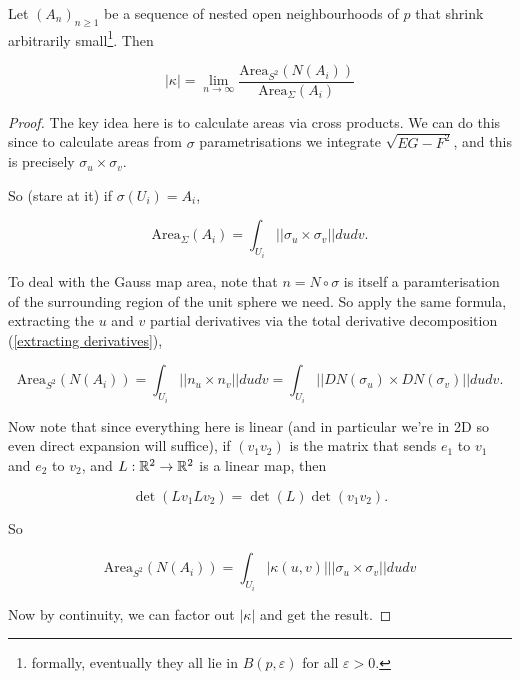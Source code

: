 \documentclass[11pt]{scrartcl}
\begin{document}
\begin{proposition}

Let $(A_n)_{n \ge 1}$ be a sequence of nested open neighbourhoods of $p$ that shrink arbitrarily small\footnote{formally, eventually they all lie in $B(p, \varepsilon)$ for all $\varepsilon > 0$.}. Then 

\begin{equation}
    |\kappa| = \lim_{n \rightarrow \infty} \frac{\text{Area}_{S^2}(N(A_i))}{\text{Area}_\Sigma(A_i)}
\end{equation} 

\begin{proof}
    The key idea here is to calculate areas via cross products. We can do this since to calculate areas from $\sigma$ parametrisations we integrate $\sqrt{EG-F^2}$, and this is precisely $\sigma_u \times \sigma_v$.
    
    So (stare at it) if $\sigma(U_i) = A_i$,

    \begin{equation}
        \text{Area}_\Sigma(A_i) = \int_{U_i} ||\sigma_u \times \sigma_v|| du dv.
    \end{equation}

    To deal with the Gauss map area, note that $n = N \circ \sigma$ is itself a paramterisation of the surrounding region of the unit sphere we need. So apply the same formula, extracting the $u$ and $v$ partial derivatives via the total derivative decomposition (\ref{extracting derivatives}),

    \begin{equation}
        \text{Area}_{S^2}(N(A_i)) = \int_{U_i} ||n_u \times n_v|| du dv = \int_{U_i} ||DN(\sigma_u) \times DN(\sigma_v)|| du dv.
    \end{equation}

    Now note that since everything here is linear (and in particular we're in 2D so even direct expansion will suffice), if $(v_1 v_2)$ is the matrix that sends $e_1$ to $v_1$ and $e_2$ to $v_2$, and $L:\mathbb R^2 \rightarrow \mathbb R^2$ is a linear map, then

    \begin{equation}
        \det(Lv_1 Lv_2) = \det (L) \det(v_1 v_2).
    \end{equation}

    So 

    \begin{equation}
        \text{Area}_{S^2}(N(A_i)) = \int_{U_i} |\kappa(u,v)| ||\sigma_u \times \sigma_v|| du dv %
    \end{equation}

    Now by continuity, we can factor out $|\kappa|$ and get the result.
\end{proof}
\end{proposition}
\end{document}
